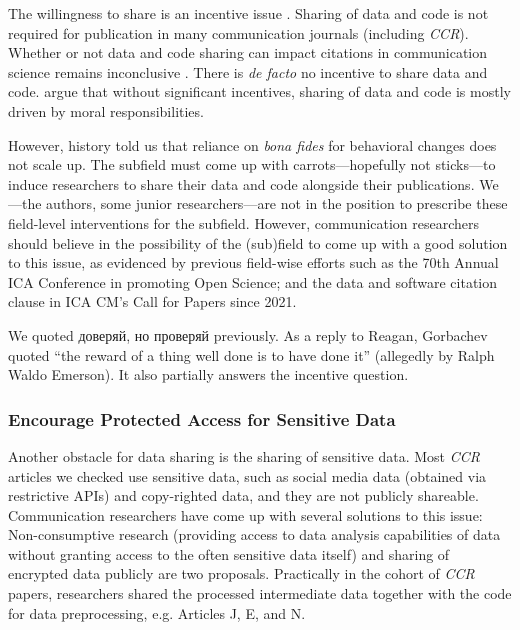 The willingness to share is an incentive issue \parencite[]{akdeniz:2023:S}. Sharing of data and code is not required for publication in many communication journals (including \textit{CCR}). Whether or not data and code sharing can impact citations in communication science remains inconclusive \parencite[]{markowitz:2021:TAE}. There is \textit{de facto} no incentive to share data and code. \textcite{schoch:2023:CRC} argue that without significant incentives, sharing of data and code is mostly driven by moral responsibilities. %

However, history told us that reliance on \textit{bona fides} for behavioral changes does not scale up. The subfield must come up with carrots---hopefully not sticks---to induce researchers to share their data and code alongside their publications. We---the authors, some junior researchers---are not in the position to prescribe these field-level interventions for the subfield. However, communication researchers should believe in the possibility of the (sub)field to come up with a good solution to this issue, as evidenced by previous field-wise efforts such as the 70th Annual ICA Conference in promoting Open Science; and the data and software citation clause in ICA CM's Call for Papers since 2021.

We quoted доверяй, но проверяй previously. As a reply to Reagan, Gorbachev quoted ``the reward of a thing well done is to have done it'' (allegedly by Ralph Waldo Emerson). It also partially answers the incentive question.

\subsubsection{Encourage Protected Access for Sensitive Data}

Another obstacle for data sharing is the sharing of sensitive data. Most \textit{CCR} articles we checked use sensitive data, such as social media data (obtained via restrictive APIs) and copy-righted data, and they are not publicly shareable. Communication researchers have come up with several solutions to this issue: Non-consumptive research \parencite{van:2020:TSY, nonconsumptive} (providing access to data analysis capabilities of data without granting access to the often sensitive data itself) and sharing of encrypted data publicly \parencite[]{vanccs} are two proposals. Practically in the cohort of \textit{CCR} papers, researchers shared the processed intermediate data together with the code for data preprocessing, e.g. Articles J, E, and N.

